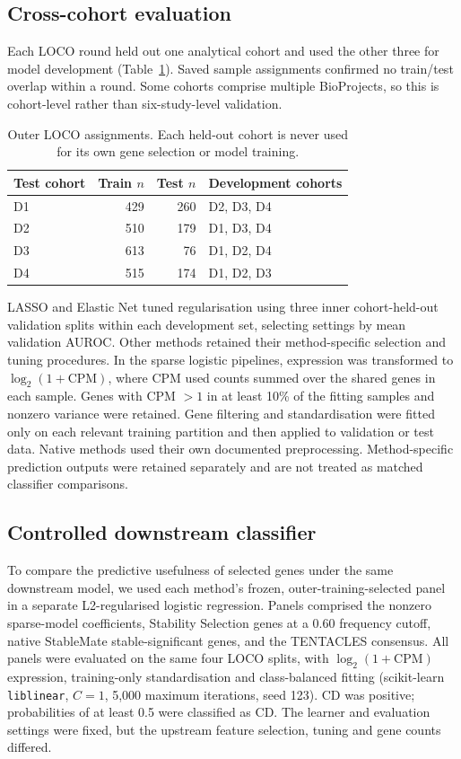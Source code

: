 \subsection{Cross-cohort evaluation}
\label{sec:evaluation_design}
Each LOCO round held out one analytical cohort and used the other three for model development (Table~\ref{tab:splits}). Saved sample assignments confirmed no train/test overlap within a round. Some cohorts comprise multiple BioProjects, so this is cohort-level rather than six-study-level validation.

\begin{table}[!t]
\caption{Outer LOCO assignments. Each held-out cohort is never used for its own gene selection or model training.}
\label{tab:splits}
\centering\footnotesize
\begin{tabular}{@{}lrrl@{}}
\toprule
Test cohort & Train $n$ & Test $n$ & Development cohorts\\
\midrule
D1 & 429 & 260 & D2, D3, D4\\
D2 & 510 & 179 & D1, D3, D4\\
D3 & 613 & 76 & D1, D2, D4\\
D4 & 515 & 174 & D1, D2, D3\\
\bottomrule
\end{tabular}
\end{table}

LASSO and Elastic Net tuned regularisation using three inner cohort-held-out validation splits within each development set, selecting settings by mean validation AUROC. Other methods retained their method-specific selection and tuning procedures. In the sparse logistic pipelines, expression was transformed to $\log_2(1+\mathrm{CPM})$, where CPM used counts summed over the shared genes in each sample. Genes with CPM $>1$ in at least 10\% of the fitting samples and nonzero variance were retained. Gene filtering and standardisation were fitted only on each relevant training partition and then applied to validation or test data. Native methods used their own documented preprocessing. Method-specific prediction outputs were retained separately and are not treated as matched classifier comparisons.

\subsection{Controlled downstream classifier}
\label{sec:common_classifier}
To compare the predictive usefulness of selected genes under the same downstream model, we used each method's frozen, outer-training-selected panel in a separate L2-regularised logistic regression. Panels comprised the nonzero sparse-model coefficients, Stability Selection genes at a 0.60 frequency cutoff, native StableMate stable-significant genes, and the TENTACLES consensus. All panels were evaluated on the same four LOCO splits, with $\log_2(1+\mathrm{CPM})$ expression, training-only standardisation and class-balanced fitting (scikit-learn \texttt{liblinear}, $C=1$, 5,000 maximum iterations, seed 123). CD was positive; probabilities of at least 0.5 were classified as CD. The learner and evaluation settings were fixed, but the upstream feature selection, tuning and gene counts differed.

